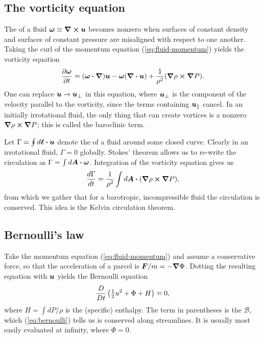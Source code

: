 \subsection{The vorticity equation}
The  of a fluid $\vb*{\omega} \equiv \curl{\vb*{u}}$ becomes nonzero when surfaces of constant density and surfaces of constant pressure are misaligned with respect to one another. Taking the curl of the momentum equation (\ref{eq:fluid-momentum}) yields the vorticity equation
\begin{align}
    \pdv{\vb*{\omega}}{t} = (\vb*{\omega} \vdot \grad) \vb*{u} - \vb*{\omega} (\div{\vb*{u}}) + \frac{1}{\rho^2} (\grad{\rho} \cp \grad{P}).
\end{align}
One can replace $\vb*{u} \to \vb*{u}_\perp$ in this equation, where $\vb*{u}_\perp$ is the component of the velocity parallel to the vorticity, since the terms containing $\vb*{u}_\parallel$ cancel. In an initially irrotational fluid, the only thing that can create vortices is a nonzero $\grad{\rho} \cp \grad{P}$; this is called the baroclinic term.

Let $\Gamma = \oint d\vb*{\ell} \vdot \vb*{u}$ denote the  of a fluid around some closed curve. Clearly in an irrotational fluid, $\Gamma = 0$ globally. Stokes' theorem allows us to re-write the circulation as $\Gamma = \int d\vb*{A} \vdot \vb*{\omega}$. Integration of the vorticity equation gives us
\begin{align}
    \dv{\Gamma}{t} = \frac{1}{\rho^2} \int d\vb*{A} \vdot (\grad{\rho} \cp \grad{P}),
\end{align}
from which we gather that for a barotropic, incompressible fluid the circulation is conserved. This idea is the Kelvin circulation theorem.

\subsection{Bernoulli's law}
Take the momentum equation (\ref{eq:fluid-momentum}) and assume a conservative force, so that the acceleration of a parcel is $\vb*{F}/m = -\grad{\Phi}$. Dotting the resulting equation with $\vb*{u}$ yields the Bernoulli equation
\begin{align} \label{eq:bernoulli}
    \frac{D}{Dt} \left ( \tfrac{1}{2} u^2 + \Phi + H \right ) = 0,
\end{align}
where $H = \int dP/\rho$ is the (specific) enthalpy. The term in parentheses is the  $\mathcal{B}$, which (\ref{eq:bernoulli}) tells us is conserved along streamlines. It is usually most easily evaluated at infinity, where $\Phi = 0$.

